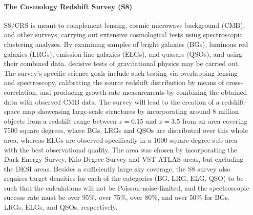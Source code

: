 \documentclass[a4paper,11pt]{article}
\begin{document}
\paragraph{The Cosmology Redshift Survey (S8)}
S8/CRS \citep{4mosts8} is meant to complement lensing, cosmic microwave background (CMB), and other surveys, carrying out extensive cosmological tests using spectroscopic clustering analyses. By examining samples of bright galaxies (BGs), luminous red galaxies (LRGs), emission-line galaxies (ELGs), and quasars (QSOs), and using their combined data, decisive tests of gravitational physics may be carried out. The survey's specific science goals include such testing via overlapping lensing and spectroscopy, calibrating the source redshift distribution by means of cross-correlation, and producing growth-rate measurements by combining the obtained data with observed CMB data. The survey will lead to the creation of a redshift-space map showcasing large-scale structures by incorporating around 8 million objects from a redshift range between $z=0.15$ and $z=3.5$ from an area covering 7500 square degrees, where BGs, LRGs and QSOs are distributed over this whole area, whereas ELGs are observed specifically in a 1000 square degree sub-area with the best observational quality. The area was chosen by incorporating the Dark Energy Survey, Kilo-Degree Survey and VST-ATLAS areas, but excluding the DESI areas. Besides a sufficiently large sky coverage, the S8 survey also requires target densities for each of the categories (BG, LRG, ELG, QSO) to be such that the calculations will not be Poisson-noise-limited, and the spectroscopic success rate must be over 95\%, over 75\%, over 80\%, and over 50\% for BGs, LRGs, ELGs, and QSOs, respectively.
%
\end{document}
